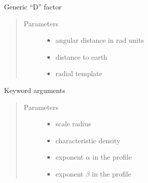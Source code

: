 \documentclass[letterpaper,10pt,english]{sphinxmanual}
\begin{document}
\begin{fulllineitems}
\label{\detokenize{diffsph.profiles:diffsph.profiles.hfactors.D_factor}}
\sphinxAtStartPar
Generic “D” factor
\begin{quote}\begin{description}
\item[{Parameters}] \leavevmode\begin{itemize}
\item {} 
\sphinxAtStartPar
{} \textendash{} angular distance in rad units

\item {} 
\sphinxAtStartPar
{} \textendash{} distance to earth

\item {} 
\sphinxAtStartPar
{} \textendash{} radial template

\end{itemize}

\end{description}\end{quote}

\sphinxAtStartPar
Keyword arguments
\begin{quote}\begin{description}
\item[{Parameters}] \leavevmode\begin{itemize}
\item {} 
\sphinxAtStartPar
{} \textendash{} scale radius

\item {} 
\sphinxAtStartPar
{} \textendash{} characteristic density

\item {} 
\sphinxAtStartPar
{} \textendash{} exponent \(\alpha\) in the {\hyperref[\detokenize{diffsph.profiles:diffsph.profiles.templates.hdz}]{}} profile

\item {} 
\sphinxAtStartPar
{} \textendash{} exponent \(\beta\) in the {\hyperref[\detokenize{diffsph.profiles:diffsph.profiles.templates.hdz}]{}} profile


\end{itemize}
\end{description}
\end{quote}
\end{fulllineitems}
\end{document}
